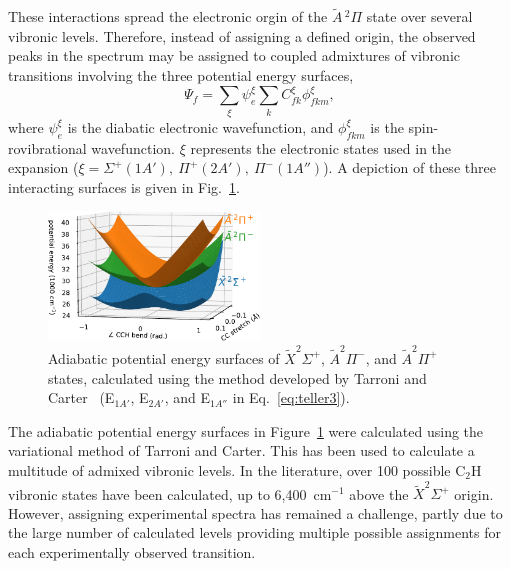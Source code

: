 \documentclass[journal=jpcafh,manuscript=article,layout=onecolumn, 12pt]{achemso}
\begin{document}
These interactions spread the electronic orgin of the $\tilde{A}\,^2\Pi$ state over several vibronic levels. Therefore, instead of assigning a defined origin, the observed peaks in the spectrum may be assigned to coupled admixtures of vibronic transitions involving the three potential energy surfaces,
\begin{equation}
\Psi_f = \sum_\xi \psi_e^\xi \sum_k C_{fk}^\xi\phi_{fkm}^\xi,
\label{eq:teller3} 
\end{equation}
where $\psi_e^\xi$ is the diabatic electronic wavefunction, and $\phi_{fkm}^\xi$ is the spin-rovibrational wavefunction. $\xi$ represents the electronic states used in the expansion ($\xi=\Sigma^+(1A'),~\Pi^+(2A'),~\Pi^-(1A'')$). A depiction of these three interacting surfaces is given in Fig.~\ref{fig:3}.

\begin{figure}
	\centering
	\includegraphics[width=0.5\textwidth]{figures/Fig3}
	\caption{Adiabatic potential energy surfaces of $\tilde{X}^2\Sigma^+$, $\tilde{A}^2\Pi^-$, and $\tilde{A}^2\Pi^+$ states, calculated using the method developed by Tarroni and Carter~\cite{tar03} (E$_{1A'}$, E$_{2A'}$, and E$_{1A''}$ in Eq.~\ref{eq:teller3}).}
	\label{fig:3}
\end{figure}

The adiabatic potential energy surfaces in Figure~\ref{fig:3} were calculated using the variational method of Tarroni and Carter. This has been used to calculate a multitude of admixed vibronic levels. In the literature, over 100 possible C$_2$H vibronic states have been calculated, up to 6,400~cm$^{-1}$ above the $\tilde{X} ^2\Sigma^+$ origin. However, assigning experimental spectra has remained a challenge, partly due to the large number of calculated levels providing multiple possible assignments for each experimentally observed transition.
\end{document}
